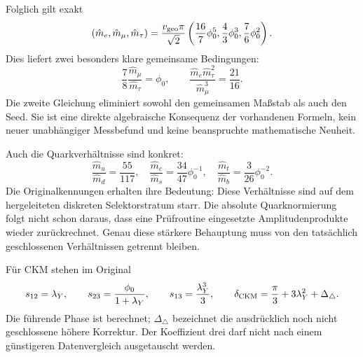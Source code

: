 Folglich gilt exakt
\begin{equation}
(\hat m_e,\hat m_\mu,\hat m_\tau)
=\frac{v_{\rm geo}\pi}{\sqrt2}
\left(\frac{16}7\phi_0^5,\frac43\phi_0^3,\frac76\phi_0^2\right).
\end{equation}
Dies liefert zwei besonders klare gemeinsame Bedingungen:
\begin{equation}\label{eq:physicalleptonelimination}
\boxed{\frac78\frac{\hat m_\mu}{\hat m_\tau}=\phi_0,
\qquad
\frac{\hat m_e\hat m_\tau^2}{\hat m_\mu^3}=\frac{21}{16}.}
\end{equation}
Die zweite Gleichung eliminiert sowohl den gemeinsamen Maßstab als auch den Seed. Sie ist eine direkte algebraische Konsequenz der vorhandenen Formeln, kein neuer unabhängiger Messbefund und keine beanspruchte mathematische Neuheit.

Auch die Quarkverhältnisse sind konkret:
\begin{equation}
\frac{\hat m_u}{\hat m_d}=\frac{55}{117},\quad
\frac{\hat m_c}{\hat m_s}=\frac{34}{47}\phi_0^{-1},\quad
\frac{\hat m_t}{\hat m_b}=\frac3{26}\phi_0^{-2}.
\end{equation}
Die Originalkennungen  erhalten ihre Bedeutung: Diese Verhältnisse sind auf dem hergeleiteten diskreten Selektorstratum starr. Die absolute Quarknormierung folgt nicht schon daraus, dass eine Prüfroutine eingesetzte Amplitudenprodukte wieder zurückrechnet. Genau diese stärkere Behauptung muss von den tatsächlich geschlossenen Verhältnissen getrennt bleiben.

Für CKM stehen im Original
\begin{equation}
s_{12}=\lambda_Y,\qquad s_{23}=\frac{\phi_0}{1+\lambda_Y},\qquad
s_{13}=\frac{\lambda_Y^3}{3},\qquad
\delta_{\rm CKM}=\frac\pi3+3\lambda_Y^2+\Delta_\triangle.
\end{equation}
Die führende Phase ist berechnet; $\Delta_\triangle$ bezeichnet die ausdrücklich noch nicht geschlossene höhere Korrektur. Der Koeffizient drei darf nicht nach einem günstigeren Datenvergleich ausgetauscht werden.

